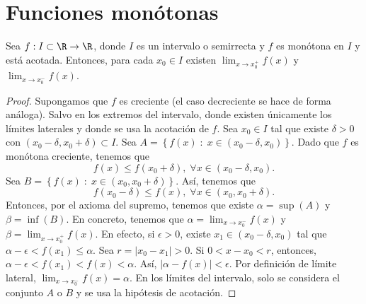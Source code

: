 \section{Funciones monótonas}
\begin{ftheorem}[]
\normalfont Sea $\displaystyle f : I \subset \R \to \R $, donde $\displaystyle I $ es un intervalo o semirrecta y $\displaystyle f $ es monótona en $\displaystyle I $ y está acotada. Entonces, para cada $\displaystyle x_{0} \in I $ existen $\displaystyle \lim_{x \to x_{0}^{+}}f\left(x\right) $ y $\displaystyle \lim_{x \to x_{0}^{-}}f\left(x\right) $.
\end{ftheorem}
\begin{proof}
	Supongamos que $\displaystyle f $ es creciente (el caso decreciente se hace de forma análoga). Salvo en los extremos del intervalo, donde existen únicamente los límites laterales y donde se usa la acotación de $\displaystyle f $. Sea $\displaystyle x_{0} \in I $ tal que existe $\displaystyle \delta > 0 $ con $\displaystyle \left(x_{0}-\delta, x_{0}+\delta \right)\subset I $. Sea $\displaystyle A = \left\{ f\left(x\right) \; : \; x \in \left(x_{0}-\delta, x_{0} \right)\right\}  $. Dado que $\displaystyle f $ es monótona creciente, tenemos que
	\[f\left(x\right) \leq f\left(x_{0} + \delta \right), \; \forall x \in \left(x_{0} - \delta, x_{0}\right) .\]
	Sea $\displaystyle B = \left\{ f\left(x\right) \; : \; x \in \left(x_{0}, x_{0}+\delta \right)\right\}  $. Así, tenemos que 
	\[ f\left(x_{0}-\delta \right)\leq f\left(x\right), \; \forall x \in \left(x_{0}, x_{0}+\delta\right) .\]
Entonces, por el axioma del supremo, tenemos que existe $\displaystyle \alpha = \sup\left(A\right) $ y $\displaystyle \beta = \inf\left(B\right) $. En concreto, tenemos que $\displaystyle \alpha = \lim_{x \to x_{0}^{-}}f\left(x\right) $ y $\displaystyle \beta = \lim_{x \to x_{0}^{+}}f\left(x\right) $. En efecto, si $\displaystyle \epsilon > 0 $, existe $\displaystyle x_{1} \in \left(x_{0}-\delta, x_{0} \right) $ tal que $\displaystyle \alpha - \epsilon < f\left(x_{1}\right) \leq \alpha  $. Sea $\displaystyle r = \left|x_{0}-x_{1}\right| > 0 $. Si $\displaystyle 0 < x - x_{0} < r $, entonces, $\displaystyle \alpha - \epsilon < f\left(x_{1}\right) < f\left(x\right) < \alpha  $. Así, $\displaystyle \left|\alpha - f\left(x\right)\right| < \epsilon  $. Por definición de límite lateral, $\displaystyle \lim_{x \to x_{0}^{-}}f\left(x\right) = \alpha  $.
En los límites del intervalo, solo se considera el conjunto $\displaystyle A $  o $\displaystyle B $ y se usa la hipótesis de acotación.
\end{proof}
